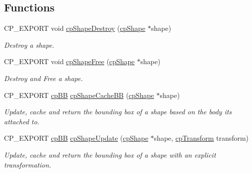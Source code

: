 \subsection*{Functions}
\begin{DoxyCompactItemize}
\item 
\mbox{\label{group__cp_shape_ga16db3767b479bc1dcd169f362fa80cb5}} 
C\+P\+\_\+\+E\+X\+P\+O\+RT void \mbox{\hyperlink{group__cp_shape_ga16db3767b479bc1dcd169f362fa80cb5}{cp\+Shape\+Destroy}} (\mbox{\hyperlink{structcp_shape}{cp\+Shape}} $\ast$shape)
\begin{DoxyCompactList}\small\item\em Destroy a shape. \end{DoxyCompactList}\item 
\mbox{\label{group__cp_shape_ga02e1c9ffa26da3a0a40d6846a3d1dbe7}} 
C\+P\+\_\+\+E\+X\+P\+O\+RT void \mbox{\hyperlink{group__cp_shape_ga02e1c9ffa26da3a0a40d6846a3d1dbe7}{cp\+Shape\+Free}} (\mbox{\hyperlink{structcp_shape}{cp\+Shape}} $\ast$shape)
\begin{DoxyCompactList}\small\item\em Destroy and Free a shape. \end{DoxyCompactList}\item 
\mbox{\label{group__cp_shape_ga899d6f70c74747d4cb52b778447c81e8}} 
C\+P\+\_\+\+E\+X\+P\+O\+RT \mbox{\hyperlink{structcp_b_b}{cp\+BB}} \mbox{\hyperlink{group__cp_shape_ga899d6f70c74747d4cb52b778447c81e8}{cp\+Shape\+Cache\+BB}} (\mbox{\hyperlink{structcp_shape}{cp\+Shape}} $\ast$shape)
\begin{DoxyCompactList}\small\item\em Update, cache and return the bounding box of a shape based on the body it\textquotesingle{}s attached to. \end{DoxyCompactList}\item 
\mbox{\label{group__cp_shape_gaa3ce1518fb4739b0b4e8964dfb7cd728}} 
C\+P\+\_\+\+E\+X\+P\+O\+RT \mbox{\hyperlink{structcp_b_b}{cp\+BB}} \mbox{\hyperlink{group__cp_shape_gaa3ce1518fb4739b0b4e8964dfb7cd728}{cp\+Shape\+Update}} (\mbox{\hyperlink{structcp_shape}{cp\+Shape}} $\ast$shape, \mbox{\hyperlink{structcp_transform}{cp\+Transform}} transform)
\begin{DoxyCompactList}\small\item\em Update, cache and return the bounding box of a shape with an explicit transformation. \end{DoxyCompactList}\item 

\end{DoxyCompactItemize}
